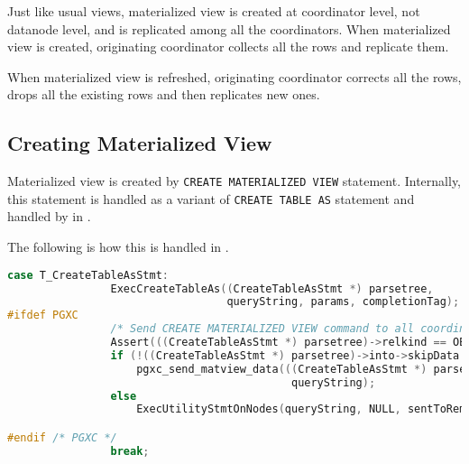 %
%

  Just like usual views, materialized view is created at coordinator level, not datanode level,
  and is replicated among all the coordinators.
  When materialized view is created, originating coordinator collects all the rows and
  replicate them.
  
  When materialized view is refreshed, originating coordinator corrects all the rows,
  drops all the existing rows and then replicates new ones.
  


\subsection{Creating Materialized View}
  
  Materialized view is created by \texttt{CREATE MATERIALIZED VIEW} statement.
  Internally, this statement is handled as a variant of \texttt{CREATE TABLE AS} statement and
  handled by  in .
  
  The following is how this is handled in .

  \lstset{tabsize=4, xleftmargin=20pt, basicstyle=\ttfamily\scriptsize, breaklines=true}
  \begin{lstlisting}[frame=single, tabsize=4, language=C]
            case T_CreateTableAsStmt:
                ExecCreateTableAs((CreateTableAsStmt *) parsetree,
                                  queryString, params, completionTag);
#ifdef PGXC
                /* Send CREATE MATERIALIZED VIEW command to all coordinators. */
                Assert(((CreateTableAsStmt *) parsetree)->relkind == OBJECT_MATVIEW);
                if (!((CreateTableAsStmt *) parsetree)->into->skipData && !IsConnFromCoord())
                    pgxc_send_matview_data(((CreateTableAsStmt *) parsetree)->into->rel,
                                            queryString);
                else
                    ExecUtilityStmtOnNodes(queryString, NULL, sentToRemote, false, EXEC_ON_COORDS, false);

#endif /* PGXC */
                break;
  \end{lstlisting}

